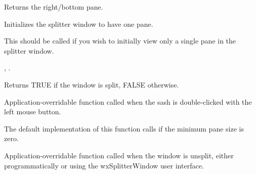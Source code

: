 Returns the right/bottom pane.

\label{wxsplitterwndinitialize}


Initializes the splitter window to have one pane.




This should be called if you wish to initially view only a single pane in the splitter window.


,\rtfsp
{}.

\label{wxsplitterwndissplit}


Returns TRUE if the window is split, FALSE otherwise.

\label{wxsplitterwndondoubleclicksash}


Application-overridable function called when the sash is double-clicked with
the left mouse button.





The default implementation of this function calls  if
the minimum pane size is zero.



\label{wxsplitterwndonunsplit}


Application-overridable function called when the window is unsplit, either
programmatically or using the wxSplitterWindow user interface.

